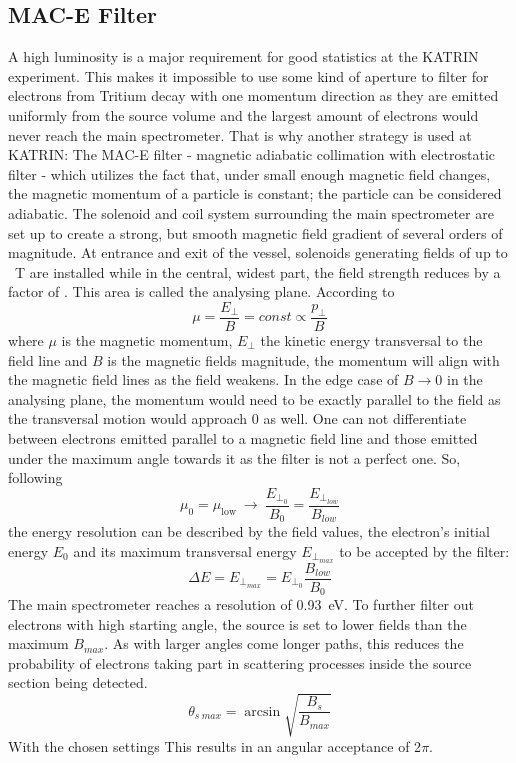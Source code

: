        \subsection{MAC-E Filter}
      \label{ch:The KATRIN experiment:sec:MAC-E}
      A high luminosity is a major requirement for good statistics at the KATRIN experiment. This makes it impossible to use some kind of aperture to filter for electrons from Tritium decay with one momentum direction as they are emitted uniformly from the source volume and the largest amount of electrons would never reach the main spectrometer. That is why another strategy is used at KATRIN: The MAC-E filter - magnetic adiabatic collimation with electrostatic filter - which utilizes the fact that, under small enough magnetic field changes, the magnetic momentum of a particle is constant; the particle can be considered adiabatic. The solenoid and coil system surrounding the main spectrometer are set up to create a strong, but smooth magnetic field gradient of several orders of magnitude. At entrance and exit of the vessel, solenoids generating fields of up to \SI{}{\tesla} are installed while in the central, widest part, the field strength reduces by a factor of . This area is called the analysing plane. According to
      \begin{equation}
      	\mu = \frac{E_{\bot}}{B} = const \propto \frac{p_\bot}{B}
      \end{equation}
      where $\mu$ is the magnetic momentum, $E_\bot$ the kinetic energy transversal to the field line and $B$ is the magnetic fields magnitude, the momentum will align with the magnetic field lines as the field weakens. In the edge case of $B\rightarrow 0$ in the analysing plane, the momentum would need to be exactly parallel to the field as the transversal motion would approach 0 as well. 
      One can not differentiate between electrons emitted parallel to a magnetic field line and those emitted under the maximum angle towards it as the filter is not a perfect one. So, following
      \begin{equation}
      	\mu_{\mathrm{0}} = \mu_{\mathrm{low}} ~ \longrightarrow ~ \frac{E_{\bot_0}}{B_0} = \frac{E_{\bot_{low}}}{B_{low}} 
      \end{equation}
      the energy resolution can be described by the field values, the electron's initial energy $E_0$ and its maximum transversal energy $E_{\bot_{max}}$ to be accepted by the filter:
      \begin{equation}
	    \Delta E = E_{\bot_{max}} = E_{\bot_0}\frac{B_{low}}{B_{0}}
      \end{equation}
      The main spectrometer reaches a resolution of \SI{0.93}{\electronvolt}.
      To further filter out electrons with high starting angle, the source is set to lower fields than the maximum $B_{max}$.
      As with larger angles come longer paths, this reduces the probability of electrons taking part in scattering processes inside the source section being detected.
      \begin{equation}
      	\theta_{s~max}= \arcsin{\sqrt{\frac{B_s}{B_{max}}}}
      \end{equation}
      With the chosen settings This results in an angular acceptance of 2$\pi$.
      
